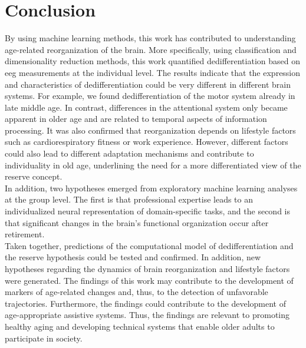 \section{Conclusion}
By using machine learning methods, this work has contributed to understanding age-related reorganization of the brain. More specifically, using classification and dimensionality reduction methods, this work quantified dedifferentiation based on \gls{eeg} measurements at the individual level. The results indicate that the expression and characteristics of dedifferentiation could be very different in different brain systems. For example, we found dedifferentiation of the motor system already in late middle age. In contrast, differences in the attentional system only became apparent in older age and are related to temporal aspects of information processing. It was also confirmed that reorganization depends on lifestyle factors such as cardiorespiratory fitness or work experience. However, different factors could also lead to different adaptation mechanisms and contribute to individuality in old age, underlining the need for a more differentiated view of the reserve concept.\\
In addition, two hypotheses emerged from exploratory machine learning analyses at the group level. The first is that professional expertise leads to an individualized neural representation of domain-specific tasks, and the second is that significant changes in the brain's functional organization occur after retirement.\\
Taken together, predictions of the computational model of dedifferentiation and the reserve hypothesis could be tested and confirmed. In addition, new hypotheses regarding the dynamics of brain reorganization and lifestyle factors were generated. The findings of this work may contribute to the development of markers of age-related changes and, thus, to the detection of unfavorable trajectories. Furthermore, the findings could contribute to the development of age-appropriate assistive systems. Thus, the findings are relevant to promoting healthy aging and developing technical systems that enable older adults to participate in society.




